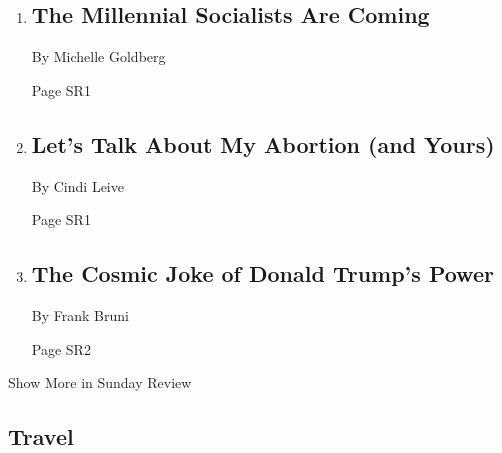 \begin{enumerate}
\def\labelenumi{\arabic{enumi}.}
\item
  \href{/2018/06/30/opinion/democratic-socialists-progressive-democratic-party-trump.html}{}

  \hypertarget{the-millennial-socialists-are-coming}{%
  \subsection{The Millennial Socialists Are
  Coming}\label{the-millennial-socialists-are-coming}}

  By Michelle Goldberg

  Page SR1
\item
  \href{/2018/06/30/opinion/sunday/abortion-kennedy-supreme-court.html}{}

  \hypertarget{lets-talk-about-my-abortion-and-yours}{%
  \subsection{Let's Talk About My Abortion (and
  Yours)}\label{lets-talk-about-my-abortion-and-yours}}

  By Cindi Leive

  Page SR1
\item
  \href{/2018/06/28/opinion/trump-supreme-court.html}{}

  \hypertarget{the-cosmic-joke-of-donald-trumps-power}{%
  \subsection{The Cosmic Joke of Donald Trump's
  Power}\label{the-cosmic-joke-of-donald-trumps-power}}

  By Frank Bruni

  Page SR2
\end{enumerate}

Show More in Sunday Review

\hypertarget{travel}{%
\subsection{Travel}\label{travel}}


